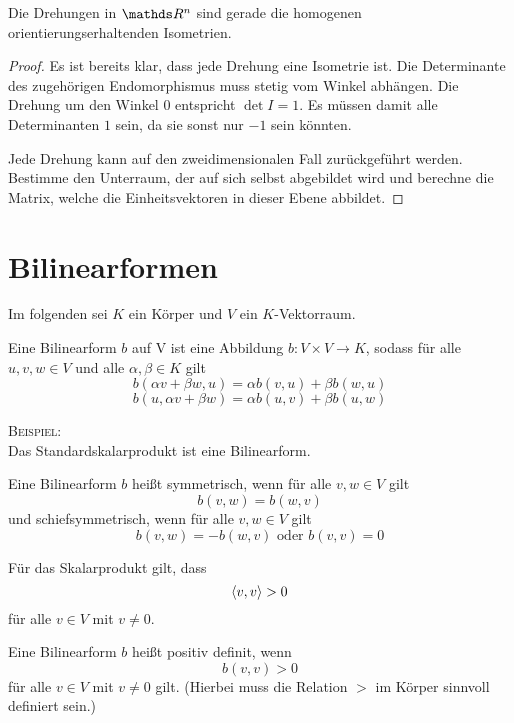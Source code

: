 		\begin{corollary}
			Die Drehungen in $\SR^n$ sind gerade die homogenen orientierungserhaltenden Isometrien.
		\end{corollary}
		\begin{proof}
			Es ist bereits klar, dass jede Drehung eine Isometrie ist.
			Die Determinante des zugehörigen Endomorphismus muss stetig vom Winkel abhängen.
			Die Drehung um den Winkel $0$ entspricht $\det I = 1$.
			Es müssen damit alle Determinanten $1$ sein, da sie sonst nur $-1$ sein könnten.

			Jede Drehung kann auf den zweidimensionalen Fall zurückgeführt werden.
			Bestimme den Unterraum, der auf sich selbst abgebildet wird und berechne die Matrix, welche die Einheitsvektoren in dieser Ebene abbildet.
		\end{proof}


	\section{Bilinearformen} %
	\label{sec:bilinearformen}
	
		Im folgenden sei $K$ ein Körper und $V$ ein $K$-Vektorraum.

		\begin{definition}[Bilinearform]
			Eine Bilinearform $b$ auf V ist eine Abbildung $b:V\times V\longrightarrow K$, sodass für alle $u,v,w\in V$ und alle $\alpha,\beta\in K$ gilt 
			\[
				b(\alpha v + \beta w, u) = \alpha b(v,u) + \beta b(w,u)
			\]
			\[
				b(u, \alpha v + \beta w) = \alpha b(u,v) + \beta b(u,w)
			\]
		\end{definition}

		\textsc{Beispiel:}\\
		Das Standardskalarprodukt ist eine Bilinearform.

		\begin{definition}
			Eine Bilinearform $b$ heißt symmetrisch, wenn für alle $v,w\in V$ gilt
			\[
				b(v,w) = b(w,v)
			\]
			und schiefsymmetrisch, wenn für alle $v,w\in V$ gilt
			\[
				b(v,w) = -b(w,v) \text{ oder } b(v,v) = 0
			\]
		\end{definition}

		Für das Skalarprodukt gilt, dass 
		\[
			\left\langle v,v \right\rangle > 0
		\]
		für alle $v\in V$ mit $v\neq 0$.

		\begin{definition}
			Eine Bilinearform $b$ heißt positiv definit, wenn
			\[
				b(v,v) > 0
			\]
			für alle $v\in V$ mit $v\neq 0$ gilt.
			(Hierbei muss die Relation $>$ im Körper sinnvoll definiert sein.)
		\end{definition}

